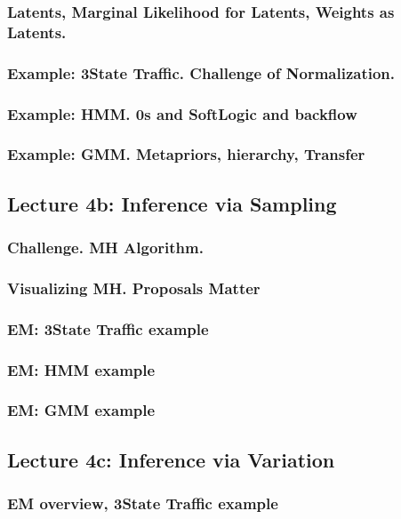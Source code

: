 \documentclass[12pt]{article}
\begin{document}
      \subsubsection*{Latents, Marginal Likelihood for Latents, Weights as Latents.}
      \subsubsection*{Example: 3State Traffic.  Challenge of Normalization.}
      \subsubsection*{Example: HMM.  0s and SoftLogic and backflow}
      \subsubsection*{Example: GMM.  Metapriors, hierarchy, Transfer}
    \newpage

    \subsection*{Lecture 4b: Inference via Sampling} %
      \subsubsection*{Challenge.  MH Algorithm.}
      \subsubsection*{Visualizing MH.  Proposals Matter}
      \subsubsection*{EM: 3State Traffic example}
      \subsubsection*{EM: HMM example}
      \subsubsection*{EM: GMM example}
    \newpage

    \subsection*{Lecture 4c: Inference via Variation} %
      \subsubsection*{EM overview, 3State Traffic example}
\end{document}
